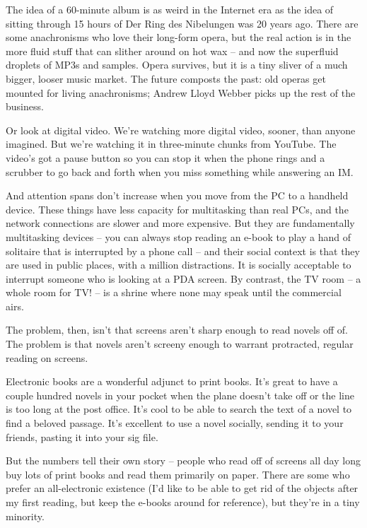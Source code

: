 The idea of a 60-minute album is as weird in the Internet era as
the idea of sitting through 15 hours of Der Ring des Nibelungen was
20 years ago. There are some anachronisms who love their long-form
opera, but the real action is in the more fluid stuff that can
slither around on hot wax -- and now the superfluid droplets of
MP3s and samples. Opera survives, but it is a tiny sliver of a much
bigger, looser music market. The future composts the past: old
operas get mounted for living anachronisms; Andrew Lloyd Webber
picks up the rest of the business.

Or look at digital video. We're watching more digital video,
sooner, than anyone imagined. But we're watching it in three-minute
chunks from YouTube. The video's got a pause button so you can stop
it when the phone rings and a scrubber to go back and forth when
you miss something while answering an IM.

And attention spans don't increase when you move from the PC to a
handheld device. These things have less capacity for multitasking
than real PCs, and the network connections are slower and more
expensive. But they are fundamentally multitasking devices -- you
can always stop reading an e-book to play a hand of solitaire that
is interrupted by a phone call -- and their social context is that
they are used in public places, with a million distractions. It is
socially acceptable to interrupt someone who is looking at a PDA
screen. By contrast, the TV room -- a whole room for TV! -- is a
shrine where none may speak until the commercial airs.

The problem, then, isn't that screens aren't sharp enough to read
novels off of. The problem is that novels aren't screeny enough to
warrant protracted, regular reading on screens.

Electronic books are a wonderful adjunct to print books. It's great
to have a couple hundred novels in your pocket when the plane
doesn't take off or the line is too long at the post office. It's
cool to be able to search the text of a novel to find a beloved
passage. It's excellent to use a novel socially, sending it to your
friends, pasting it into your sig file.

But the numbers tell their own story -- people who read off of
screens all day long buy lots of print books and read them
primarily on paper. There are some who prefer an all-electronic
existence (I'd like to be able to get rid of the objects after my
first reading, but keep the e-books around for reference), but
they're in a tiny minority.


